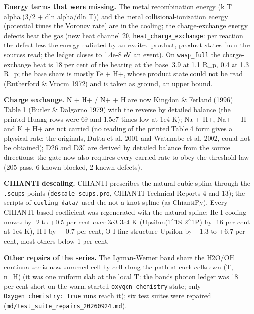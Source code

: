 \documentclass[english,a4paper]{my_memo}
\begin{document}
\textbf{Energy terms that were missing.} The metal recombination energy (k T
alpha (3/2 + dln alpha/dln T)) and the metal collisional-ionization energy
(potential times the Voronov rate) are in the cooling; the charge-exchange
energy defects heat the gas (new heat channel 20, \texttt{heat\_charge\_exchange}:
per reaction the defect less the energy radiated by an excited product,
product states from the sources read; the ledger closes to 1.4e-8 eV an
event). On \texttt{wasp\_full} the charge-exchange heat is 18 per cent of the
heating at the base, 3.9 at 1.1 R\_p, 0.4 at 1.3 R\_p; the base share is
mostly Fe + H+, whose product state could not be read (Rutherford \& Vroom
1972) and is taken as ground, an upper bound.

\textbf{Charge exchange.} N + H+ / N+ + H are now Kingdon \& Ferland (1996) Table 1
(Butler \& Dalgarno 1979) with the reverse by detailed balance (the printed
Huang rows were 69 and 1.5e7 times low at 1e4 K); Na + H+, Na+ + H and K + H+
are not carried (no reading of the printed Table 4 form gives a physical
rate; the originals, Dutta et al. 2001 and Watanabe et al. 2002, could not be
obtained); D26 and D30 are derived by detailed balance from the source
directions; the gate now also requires every carried rate to obey the
threshold law (205 pass, 6 known blocked, 2 known defects).

\textbf{CHIANTI descaling.} CHIANTI prescribes the natural cubic spline through
the \texttt{.scups} points (\texttt{descale\_scups.pro}, CHIANTI Technical Reports 4 and 13);
the scripts of \texttt{cooling\_data/} used the not-a-knot spline (as ChiantiPy).
Every CHIANTI-based coefficient was regenerated with the natural spline: He I
cooling moves by -2 to +0.5 per cent over 3e3-3e4 K (Upsilon(1\^{}1S-2\^{}1P) by
-16 per cent at 1e4 K), H I by +-0.7 per cent, O I fine-structure Upsilon by
+1.3 to +6.7 per cent, most others below 1 per cent.

\textbf{Other repairs of the series.} The Lyman-Werner band share the H2O/OH
continua see is now summed cell by cell along the path at each cell\textquotesingle s own
(T, n\_H) (it was one uniform slab at the local T: the band\textquotesingle s photon ledger
was 18 per cent short on the warm-started \texttt{oxygen\_chemistry} state; only
\texttt{Oxygen\ chemistry:\ True} runs reach it); six test suites were repaired
(\texttt{md/test\_suite\_repairs\_20260924.md}).
\end{document}
